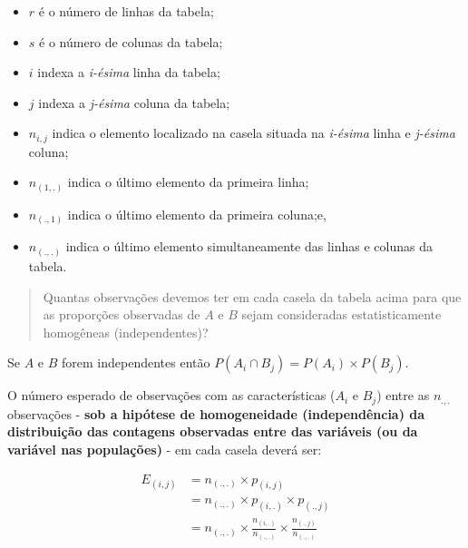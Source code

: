 \documentclass[
]{book}
\providecommand{\tightlist}{%
  \setlength{\itemsep}{0pt}\setlength{\parskip}{0pt}}
\begin{document}
\hfill\break

\begin{itemize}
\tightlist
\item
  \(r\) é o número de linhas da tabela;\\
\item
  \(s\) é o número de colunas da tabela;\\
\item
  \(i\) indexa a \emph{i-ésima} linha da tabela;\\
\item
  \(j\) indexa a \emph{j-ésima} coluna da tabela;\\
\item
  \(n_{i,j}\) indica o elemento localizado na casela situada na \emph{i-ésima} linha e \emph{j-ésima} coluna;\\
\item
  \(n_{(1,.)}\) indica o último elemento da primeira linha;\\
\item
  \(n_{(.,1)}\) indica o último elemento da primeira coluna;e,\\
\item
  \(n_{(.,.)}\) indica o último elemento simultaneamente das linhas e colunas da tabela.
\end{itemize}

\hfill\break

\begin{quote}
Quantas observações devemos ter em cada casela da tabela acima para que as proporções observadas de \(A\) e \(B\) sejam consideradas estatisticamente homogêneas (independentes)?
\end{quote}

\hfill\break

Se \(A\) e \(B\) forem independentes então \(P(A_{i} \cap B_{j})= P(A_{i}) \times P(B_{j})\).

\hfill\break

O número esperado de observações com as características (\(A_{i}\) e \(B_{j}\)) entre as \(n_{.,.}\) observações - \textbf{sob a hipótese de homogeneidade (independência) da distribuição das contagens observadas entre das variáveis (ou da variável nas populações)} - em cada casela deverá ser:

\hfill\break

\begin{align*}
E_{(i,j)} & = n_{(.,.)} \times p_{(i,j)} \\
          & = n_{(.,.)} \times p_{(i,.)} \times p_{(.,j)}  \\
          & = n_{(.,.)} \times \frac{n_{(i,.)}}{n_{(.,.)}} \times \frac{n_{(.,j)}}{n_{(.,.)}}\\
\end{align*}
\end{document}
